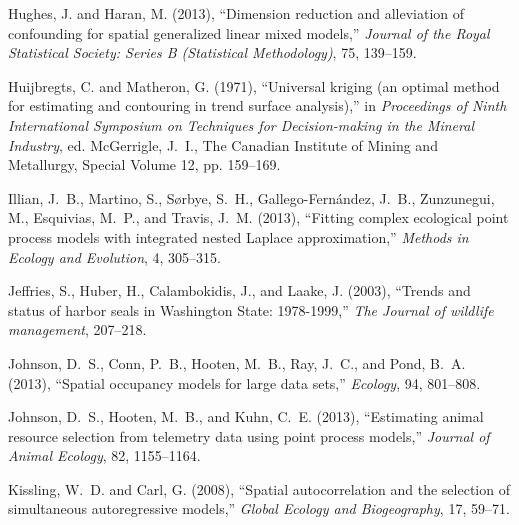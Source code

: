 \documentclass[11pt, titlepage]{article}\usepackage[]{graphicx}\usepackage[]{color}
\begin{document}
\begin{spacing}{1.9}
\begin{flushleft}
\begin{thebibliography}{126}
Hughes, J. and Haran, M. (2013), \enquote{Dimension reduction and alleviation
  of confounding for spatial generalized linear mixed models,} \textit{Journal
  of the Royal Statistical Society: Series B (Statistical Methodology)}, 75,
  139--159.

Huijbregts, C. and Matheron, G. (1971), \enquote{Universal kriging (an optimal
  method for estimating and contouring in trend surface analysis),} in
  \textit{Proceedings of Ninth International Symposium on Techniques for
  Decision-making in the Mineral Industry}, ed. McGerrigle, J.~I., The Canadian
  Institute of Mining and Metallurgy, Special Volume 12, pp. 159--169.

Illian, J.~B., Martino, S., S{\o}rbye, S.~H., Gallego-Fern{\'a}ndez, J.~B.,
  Zunzunegui, M., Esquivias, M.~P., and Travis, J.~M. (2013), \enquote{Fitting
  complex ecological point process models with integrated nested Laplace
  approximation,} \textit{Methods in Ecology and Evolution}, 4, 305--315.

Jeffries, S., Huber, H., Calambokidis, J., and Laake, J. (2003),
  \enquote{Trends and status of harbor seals in Washington State: 1978-1999,}
  \textit{The Journal of wildlife management}, 207--218.

Johnson, D.~S., Conn, P.~B., Hooten, M.~B., Ray, J.~C., and Pond, B.~A.
  (2013{}), \enquote{Spatial occupancy models for large data sets,}
  \textit{Ecology}, 94, 801--808.

Johnson, D.~S., Hooten, M.~B., and Kuhn, C.~E. (2013{}),
  \enquote{Estimating animal resource selection from telemetry data using point
  process models,} \textit{Journal of Animal Ecology}, 82, 1155--1164.

Kissling, W.~D. and Carl, G. (2008), \enquote{Spatial autocorrelation and the
  selection of simultaneous autoregressive models,} \textit{Global Ecology and
  Biogeography}, 17, 59--71.


\end{thebibliography}
\end{flushleft}
\end{spacing}
\end{document}
